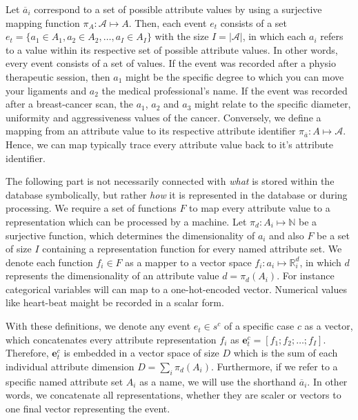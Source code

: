 \documentclass[./../../paper.tex]{subfiles}
\begin{document}
Let $\overline{a}_i$ correspond to a set of possible attribute values by using a surjective mapping function $\pi_A : \mathcal{A} \mapsto A$. Then, each event $e_t$ consists of a set $e_t = \{ a_1 \in A_1, a_2 \in A_2, \ldots, a_I \in A_I\}$ with the size $I = |\mathcal{A}|$, in which each $a_i$ refers to a value within its respective set of possible attribute values. In other words, every event consists of a set of values. If the event was recorded after a physio therapeutic session, then $a_1$ might be the specific degree to which you can move your ligaments and $a_2$ the medical professional's name. If the event was recorded after a breast-cancer scan, the $a_1$, $a_2$ and $a_3$ might relate to the specific diameter, uniformity and aggressiveness values of the cancer. 
Conversely, we define a mapping from an attribute value to its respective attribute identifier $\pi_{\overline{a}} : A \mapsto \mathcal{A}$. Hence, we can map typically trace every attribute value back to it's attribute identifier. 

The following part is not necessarily connected with \emph{what} is stored within the database symbolically, but rather \emph{how} it is represented in the database or during processing. We require a set of functions $F$ to map every attribute value to a representation which can be processed by a machine.
Let $\pi_d : A_i \mapsto \mathbb{N}$ be a surjective function, which determines the dimensionality of $a_i$ and also $F$ be a set of size $I$ containing a representation function for every named attribute set. We denote each function $f_i \in F$ as a mapper to a vector space $f_i : a_i \mapsto \mathbb{R}^d_i$, in which $d$ represents the dimensionality of an attribute value $d = \pi_d(A_i)$. For instance categorical variables will can map to a one-hot-encoded vector. Numerical values like heart-beat maight be recorded in a scalar form.

With these definitions, we denote any event $e_t \in s^c$ of a specific case $c$ as a vector, which concatenates every attribute representation $f_i$ as $\mathbf{e}_t^{c} = [f_1; f_2; \ldots; f_I]$. Therefore, $\mathbf{e}_t^{c}$ is embedded in a vector space of size $D$ which is the sum of each individual attribute dimension $D = \sum_i \pi_d(A_i)$. Furthermore, if we refer to a specific named attribute set $A_i$ as a name, we will use the shorthand $\overline{a}_i$. In other words, we concatenate all representations, whether they are scaler or vectors to one final vector representing the event.
\end{document}
